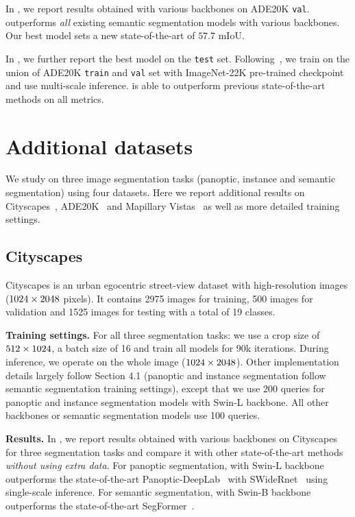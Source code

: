 In , we report \modelname results obtained with various backbones on ADE20K \texttt{val}. \modelname outperforms \emph{all} existing semantic segmentation models with various backbones. Our best model sets a new state-of-the-art of $57.7$ mIoU.

In , we further report the best \modelname model on the \texttt{test} set. Following~\cite{cheng2021maskformer}, we train \modelname on the union of ADE20K \texttt{train} and \texttt{val} set with ImageNet-22K pre-trained checkpoint and use multi-scale inference. \modelname is able to outperform previous state-of-the-art methods on all metrics.

\section{Additional datasets}
\label{app:datasets}

We study \modelname on three image segmentation tasks (panoptic, instance and semantic segmentation) using four datasets. Here we report additional results on Cityscapes~\cite{Cordts2016Cityscapes}, ADE20K~\cite{zhou2017ade20k} and Mapillary Vistas~\cite{neuhold2017mapillary} as well as more detailed training settings.

\subsection{Cityscapes}
Cityscapes is an urban egocentric street-view dataset with high-resolution images ($1024 \times 2048$ pixels). It contains 2975 images for training, 500 images for validation and 1525 images for testing with a total of 19 classes.

\noindent\textbf{Training settings.} For all three segmentation tasks: we use a crop size of $512 \times 1024$, a batch size of 16 and train all models for 90k iterations. During inference, we operate on the whole image ($1024 \times 2048$). Other implementation details largely follow Section 4.1
(panoptic and instance segmentation follow semantic segmentation training settings), except that we use 200 queries for panoptic and instance segmentation models with Swin-L backbone. All other backbones or semantic segmentation models use 100 queries.

\noindent\textbf{Results.} In , we report \modelname results obtained with various backbones on Cityscapes for three segmentation tasks and compare it with other state-of-the-art methods \emph{without using extra data}. For panoptic segmentation, \modelname with Swin-L backbone outperforms the state-of-the-art Panoptic-DeepLab~\cite{cheng2020panoptic} with SWideRnet~\cite{chen2020scaling} using single-scale inference. For semantic segmentation, \modelname with Swin-B backbone outperforms the state-of-the-art SegFormer~\cite{xie2021segformer}.

